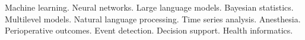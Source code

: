 

\begin{cvparagraph}

Machine learning. Neural networks. Large language models. Bayesian statistics. Multilevel models. Natural language processing. Time series analysis. Anesthesia. Perioperative outcomes. Event detection. Decision support. Health informatics.
\end{cvparagraph}